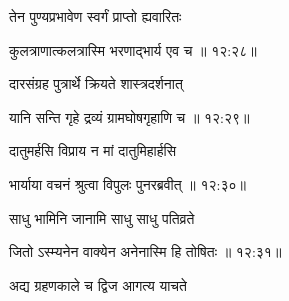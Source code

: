 {\devanagarifont तेन पुण्यप्रभावेण स्वर्गं प्राप्तो ह्यवारितः \thinspace{\dandab} \dontdisplaylinenum }%


{\devanagarifont कुलत्राणात्कलत्रास्मि भरणाद्भार्य एव च {॥ १२:२८॥} \veg\dontdisplaylinenum }%

{\devanagarifont दारसंग्रह पुत्रार्थे क्रियते शास्त्रदर्शनात् \thinspace{\dandab} \dontdisplaylinenum }%


{\devanagarifont यानि सन्ति गृहे द्रव्यं ग्रामघोषगृहाणि च {॥ १२:२९॥} \veg\dontdisplaylinenum }%
 
{\devanagarifont दातुमर्हसि विप्राय न मां दातुमिहार्हसि \thinspace{\dandab} \dontdisplaylinenum }%
 

{\devanagarifont भार्याया वचनं श्रुत्वा विपुलः पुनरब्रवीत् {॥ १२:३०॥} \veg\dontdisplaylinenum }%

{\devanagarifont साधु भामिनि जानामि साधु साधु पतिव्रते \thinspace{\dandab} \dontdisplaylinenum }%


{\devanagarifont जितो ऽस्म्यनेन वाक्येन अनेनास्मि हि तोषितः {॥ १२:३१॥} \veg\dontdisplaylinenum }%

{\devanagarifont अद्य ग्रहणकाले च द्विज आगत्य याचते \thinspace{\dandab} \dontdisplaylinenum }%
 
